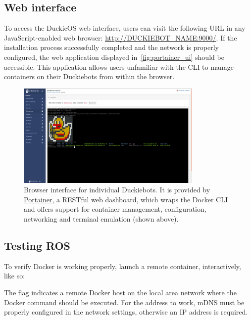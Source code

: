 \subsection{Web interface}

To access the DuckieOS web interface, users can visit the following URL in any JavaScript-enabled web browser: \url{http://DUCKIEBOT_NAME:9000/}. If the installation process successfully completed and the network is properly configured, the web application displayed in~\autoref{fig:portainer_ui} should be accessible. This application allows users unfamiliar with the CLI to manage containers on their Duckiebots from within the browser.

\begin{figure}
\includegraphics[width=0.80\textwidth]{../figures/portainer_screenshot.png}
\caption{Browser interface for individual Duckiebots. It is provided by \href{https://www.portainer.io/}{Portainer}, a RESTful web dashboard, which wraps the Docker CLI and offers support for container management, configuration, networking and terminal emulation (shown above). }
\label{fig:portainer_ui}
\end{figure}

\subsection{Testing ROS}

\noindent To verify Docker is working properly, launch a remote container, interactively, like so:

%
The  flag indicates a remote Docker host on the local area network where the Docker command should be executed. For the  address to work, mDNS must be properly configured in the network settings, otherwise an IP address is required.

